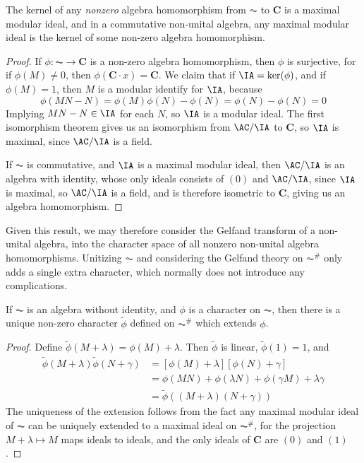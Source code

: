 \begin{lemma}
    The kernel of any {\it nonzero} algebra homomorphism from $\AC$ to $\mathbf{C}$ is a maximal modular ideal, and in a commutative non-unital algebra, any maximal modular ideal is the kernel of some non-zero algebra homomorphism.
\end{lemma}
\begin{proof}
    If $\phi: \AC \to \mathbf{C}$ is a non-zero algebra homomorphism, then $\phi$ is surjective, for if $\phi(M) \neq 0$, then $\phi(\mathbf{C} \cdot x) = \mathbf{C}$. We claim that if $\IA = \ker(\phi)$, and if $\phi(M) = 1$, then $M$ is a modular identify for $\IA$, because
    \[ \phi(MN - N) = \phi(M)\phi(N) - \phi(N) = \phi(N) - \phi(N) = 0 \]
    Implying $MN - N \in \IA$ for each $N$, so $\IA$ is a modular ideal. The first isomorphism theorem gives us an isomorphism from $\AC/\IA$ to $\mathbf{C}$, so $\IA$ is maximal, since $\AC/\IA$ is a field.

    If $\AC$ is commutative, and $\IA$ is a maximal modular ideal, then $\AC/\IA$ is an algebra with identity, whose only ideals consists of $(0)$ and $\AC/\IA$, since $\IA$ is maximal, so $\AC/\IA$ is a field, and is therefore isometric to $\mathbf{C}$, giving us an algebra homomorphism.
\end{proof}

Given this result, we may therefore consider the Gelfand transform of a non-unital algebra, into the character space of all nonzero non-unital algebra homomorphisms. Unitizing $\AC$ and considering the Gelfand theory on $\AC^\#$ only adds a single extra character, which normally does not introduce any complications.

\begin{lemma}
    If $\AC$ is an algebra without identity, and $\phi$ is a character on $\AC$, then there is a unique non-zero character $\tilde{\phi}$ defined on $\AC^\#$ which extends $\phi$.
\end{lemma}
\begin{proof}
    Define $\tilde{\phi}(M + \lambda) = \phi(M) + \lambda$. Then $\tilde{\phi}$ is linear, $\tilde{\phi}(1) = 1$, and
    \begin{align*}
        \tilde{\phi}(M + \lambda) \tilde{\phi}(N + \gamma) &= [\phi(M) + \lambda][\phi(N) + \gamma]\\
        &= \phi(MN) + \phi(\lambda N) + \phi(\gamma M) + \lambda \gamma\\
        &= \tilde{\phi}((M + \lambda)(N + \gamma))
    \end{align*}
    The uniqueness of the extension follows from the fact any maximal modular ideal of $\AC$ can be uniquely extended to a maximal ideal on $\AC^\#$, for the projection $M + \lambda \mapsto M$ maps ideals to ideals, and the only ideals of $\mathbf{C}$ are $(0)$ and $(1)$.
\end{proof}

